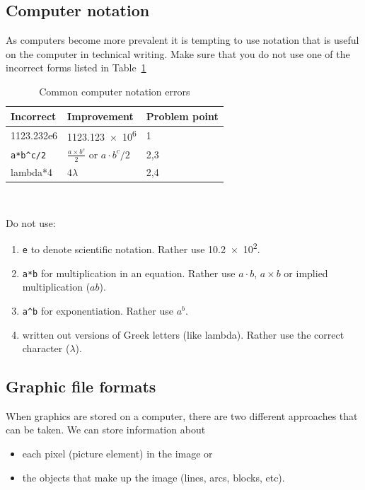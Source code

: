 \documentclass[a5paper, 10pt]{article}
\begin{document}
\subsection{Computer notation}
\label{sec:compnotation}

As computers become more prevalent it is tempting to use notation that
is useful on the computer in technical writing.  Make sure that you do
not use one of the incorrect forms listed in Table~\ref{tab:compnotation}
\begin{table}[htbp]
  \caption{Common computer notation errors}
  \label{tab:compnotation}
  \begin{centering}
    \begin{tabular}{lll}
      \toprule
      Incorrect & Improvement & Problem point \\
      \midrule
      1123.232e6 & \num{1123.123e6} & 1 \\
      \verb|a*b^c/2| & $\frac{a \times b^c}{2}$ or $a\cdot b^c / 2$ &
      2,3 \\
      lambda*4 & $4\lambda$ & 2,4 \\
      \bottomrule
    \end{tabular}\\
  \end{centering}
\end{table}

Do not use:
\begin{enumerate}
\item \verb|e| to denote scientific notation.  Rather use
  \num{10.2e2}.
\item \verb|a*b| for multiplication in an equation. Rather use
$a \cdot b$, $a \times b $ or implied multiplication ($ab$).
\item \verb|a^b| for exponentiation.  Rather use $a^b$.
\item written out versions of Greek letters (like lambda).  Rather use
  the correct character ($\lambda$).
\end{enumerate}

\subsection{Graphic file formats}
When graphics are stored on a computer, there are two different
approaches that can be taken.  We can store information about
\begin{itemize}
\item each pixel (picture element) in the image or
\item the objects that make up the image (lines, arcs, blocks, etc).
\end{itemize}
\end{document}
